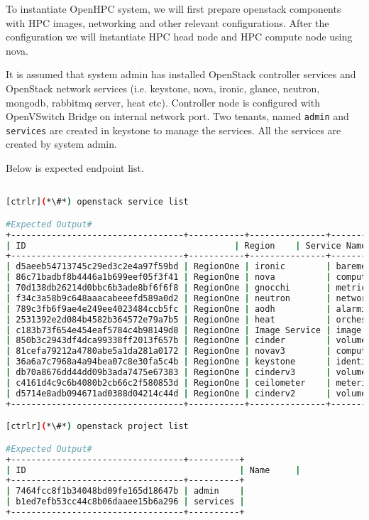 To instantiate OpenHPC system, we will first prepare openstack components with HPC images, networking and other relevant configurations. After the configuration we will instantiate HPC head node and HPC compute node using nova. 

It is assumed that system admin has installed OpenStack controller services and OpenStack network services (i.e. keystone, nova, ironic, glance, neutron, mongodb, rabbitmq server, heat etc). 
Controller node is configured with OpenVSwitch Bridge on internal network port. 
Two tenants, named \texttt{admin} and \texttt{services} are created in keystone to manage the services. All the services are created by system admin. 

Below is expected endpoint list.



\begin{lstlisting}[language=bash,keywords={}]

[ctrlr](*\#*) openstack service list

#Expected Output#
+----------------------------------+-----------+---------------+---------------+
| ID                                         | Region    | Service Name  | Service Type  |
+----------------------------------+-----------+---------------+---------------+
| d5aeeb54713745c29ed3c2e4a97f59bd | RegionOne | ironic        | baremetal     |
| 86c71badbf8b4446a1b699eef05f3f41 | RegionOne | nova          | compute       |
| 70d138db26214d0bbc6b3ade8bf6f6f8 | RegionOne | gnocchi       | metric        |
| f34c3a58b9c648aaacabeeefd589a0d2 | RegionOne | neutron       | network       |
| 789c3fb6f9ae4e249ee4023484ccb5fc | RegionOne | aodh          | alarming      |
| 2531392e2d084b4582b364572e79a7b5 | RegionOne | heat          | orchestration |
| c183b73f654e454eaf5784c4b98149d8 | RegionOne | Image Service | image         |
| 850b3c2943df4dca99338ff2013f657b | RegionOne | cinder        | volume        |
| 81cefa79212a4780abe5a1da281a0172 | RegionOne | novav3        | computev3     |
| 36a6a7c7968a4a94bea07c8e30fa5c4b | RegionOne | keystone      | identity      |
| db70a8676dd44dd09b3ada7475e67383 | RegionOne | cinderv3      | volumev3      |
| c4161d4c9c6b4080b2cb66c2f580853d | RegionOne | ceilometer    | metering      |
| d5714e8adb094671ad0388d04214c44d | RegionOne | cinderv2      | volumev2      |
+----------------------------------+-----------+---------------+---------------+

[ctrlr](*\#*) openstack project list

#Expected Output#
+----------------------------------+----------+
| ID                                          | Name     |
+----------------------------------+----------+
| 7464fcc8f1b34048bd09fe165d18647b | admin    |
| b1ed7efb53cc44c8b06daaee15b6a296 | services |
+----------------------------------+----------+
\end{lstlisting}

